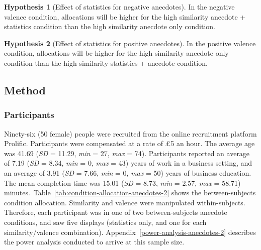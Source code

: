 \documentclass[a4paper, nobind, dvipsnames]{templates/ociamthesis}
\theoremstyle{definition}
\theoremstyle{definition}
\theoremstyle{definition}
\theoremstyle{definition}
\newtheorem{hypothesis}{Hypothesis}[chapter]
\theoremstyle{remark}
\begin{document}
\begin{hypothesis}[Effect of statistics for negative anecdotes]
\protect\hypertarget{hyp:statistics-negative-anecdotes-2}{}{\label{hyp:statistics-negative-anecdotes-2} {} }In the negative valence condition, allocations will be higher for the high
similarity anecdote + statistics condition than the high similarity
anecdote only condition.
\end{hypothesis}

\begin{hypothesis}[Effect of statistics for positive anecdotes]
\protect\hypertarget{hyp:statistics-positive-anecdotes-2}{}{\label{hyp:statistics-positive-anecdotes-2} {} }In the positive valence condition, allocations will be higher for the high
similarity anecdote only condition than the high similarity statistics +
anecdote condition.
\end{hypothesis}

\hypertarget{method-5}{%
\subsection{Method}\label{method-5}}

\hypertarget{participants-6}{%
\subsubsection{Participants}\label{participants-6}}

Ninety-six (50 female) people were recruited from the online recruitment platform Prolific. Participants were compensated at a rate of £5 an hour. The average age was 41.69 (\emph{SD} = 11.29, \emph{min} = 27, \emph{max} = 74). Participants reported an average of 7.19 (\emph{SD} = 8.34, \emph{min} = 0, \emph{max} = 43) years of work in a business setting, and an average of 3.91 (\emph{SD} = 7.66, \emph{min} = 0, \emph{max} = 50) years of business education. The mean completion time was 15.01 (\emph{SD} = 8.73, \emph{min} = 2.57, \emph{max} = 58.71) minutes.~Table~\ref{tab:condition-allocation-anecdotes-2}
shows the between-subjects condition allocation. Similarity and valence were
manipulated within-subjects. Therefore, each participant was in one of two
between-subjects anecdote conditions, and saw five displays (statistics only,
and one for each similarity/valence combination).
Appendix~\ref{power-analysis-anecdotes-2} describes the power analysis
conducted to arrive at this sample size.
\end{document}
